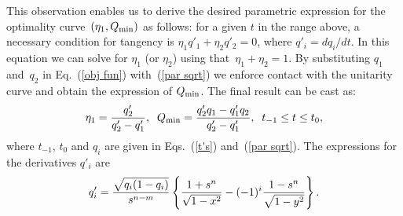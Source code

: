 \documentclass[aps,prl,twocolumn,showpacs]{revtex4}
\begin{document}
This observation enables us to derive the desired parametric expression for the optimality curve~$(\eta_1,Q_{\rm min})$ as follows: for a given $t$ in the range above, a necessary condition for tangency is \mbox{$\eta_1 q'_1+\eta_2 q'_2=0$}, where $q'_i=d q_i/d t$. In this equation we can solve for $\eta_1$ (or $\eta_2$) using that~$\eta_1+\eta_2=1$. By substituting $q_1$ and~$q_2$ in Eq.~(\ref{obj fun}) with~(\ref{par sqrt}) we enforce contact with the unitarity curve and obtain the expression of $Q_{\rm min}$. The final result can be cast as:
%
\begin{equation}
\eta_1={q'_2\over q'_2-q'_1},\;\; Q_{\rm min}={q'_2 q_1-q'_1 q_2\over q'_2-q'_1},\;\; t_{-1}\le t\le t_0,
\label{main}
\end{equation}
%
where $t_{-1}$, $t_0$ and $q_i$ are given in Eqs.~(\ref{t's}) and~(\ref{par sqrt}). The expressions for the derivatives $q'_i$ are %
%
\begin{equation}
q'_i={\sqrt{q_i(1-q_i)}\over s^{n-m}}\left\{{1+s^n\over\sqrt{1-x^2}}-(-1)^i{1-s^n\over\sqrt{1-y^2}}\right\}.
\end{equation}
%
\end{document}
